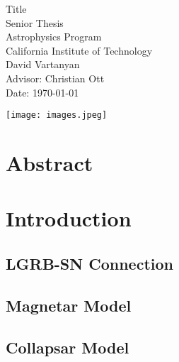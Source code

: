 \documentclass{article}
\begin{document}
\thispagestyle{empty}
\vspace*{3 cm}
\begin{center}
\Huge
Title\\
\LARGE
\vspace{3 cm}
Senior Thesis\\
Astrophysics Program\\
California Institute of Technology\\
David Vartanyan\\
\vspace{5 cm}
\large
Advisor: Christian Ott\\
Date: \today
\end{center}
\centerline{\texttt{[image: images.jpeg]}}

\newpage
\thispagestyle{empty}
\mbox{}

\newpage
{\centering\section*{Abstract}}
\setcounter{page}{1}

\newpage
\thispagestyle{empty}
\mbox{}
\newpage

{\centering\tableofcontents}
\setcounter{page}{1}
\newpage
\thispagestyle{empty}
\mbox{}
\newpage

\section{Introduction}

\subsection{LGRB-SN Connection}

\subsection{Magnetar Model}

\subsection{Collapsar Model}
\end{document}
